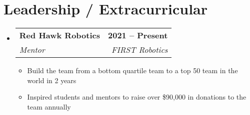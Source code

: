 \documentclass[letterpaper,11pt]{article}
\makeatletter
\newcommand{\resumeItem}[1]{
  \item\small{
    {#1 \vspace{-2pt}}
  }
}
\newcommand{\resumeSubheading}[4]{
  \vspace{-2pt}\item
    \begin{tabular*}{1.0\textwidth}[t]{l@{\extracolsep{\fill}}r}
      \textbf{#1} & \textbf{\small #2} \\
      \textit{\small#3} & \textit{\small #4} \\
    \end{tabular*}\vspace{-7pt}
}
\newcommand{\resumeSubHeadingListStart}{\begin{itemize}[leftmargin=0.0in, label={}]}
\newcommand{\resumeSubHeadingListEnd}{\end{itemize}}
\newcommand{\resumeItemListStart}{\begin{itemize}}
\newcommand{\resumeItemListEnd}{\end{itemize}\vspace{-5pt}}
\makeatother
\begin{document}
\section{Leadership / Extracurricular}
    \resumeSubHeadingListStart
        \resumeSubheading{Red Hawk Robotics}{2021 -- Present}{Mentor}{FIRST Robotics}
            \resumeItemListStart
                \resumeItem{Build the team from a bottom quartile team to a top 50 team in the world in 2 years}
                \resumeItem{Inspired students and mentors to raise over \$90,000 in donations to the team annually}
            \resumeItemListEnd
        
    \resumeSubHeadingListEnd
\end{document}
